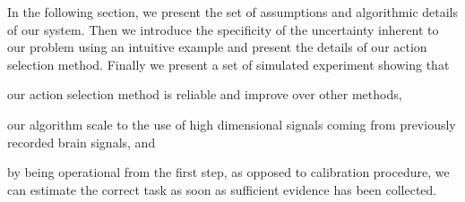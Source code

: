 In the following section, we present the set of assumptions and algorithmic details of our system. Then we introduce the specificity of the uncertainty inherent to our problem using an intuitive example and present the details of our action selection method. Finally we present a set of simulated experiment showing that 
\begin{inparaenum}[a)]
\item our action selection method is reliable and improve over other methods, 
\item our algorithm scale to the use of high dimensional signals coming from previously recorded brain signals, and
\item by being operational from the first step, as opposed to calibration procedure, we can estimate the correct task as soon as sufficient evidence has been collected.
\end{inparaenum}







